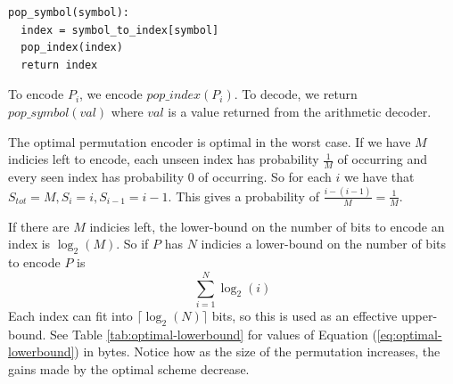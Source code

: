 \documentclass[a4paper]{report}
\begin{document}
\begin{verbatim}
pop_symbol(symbol):
  index = symbol_to_index[symbol]
  pop_index(index)
  return index
\end{verbatim}

To encode $P_i$, we encode $pop\_index(P_i)$. To decode, we return
$pop\_symbol(val)$ where $val$ is a value returned from the arithmetic
decoder.

The optimal permutation encoder is optimal in the worst case. If we have $M$
indicies left to encode, each unseen index has probability $\frac{1}{M}$ of
occurring and every seen index has probability $0$ of occurring. So for each
$i$ we have that $S_{tot}=M, S_i = i, S_{i-1} = i-1$. This gives a probability
of $\frac{i-(i-1)}{M} = \frac{1}{M}$.

If there are $M$ indicies left, the lower-bound on the number of bits to
encode an index is $\log_2(M)$. So if $P$ has $N$ indicies a lower-bound on
the number of bits to encode $P$ is
\begin{equation}
  \displaystyle\sum^{N}_{i=1} \log_2(i)
  \label{eq:optimal-lowerbound}
\end{equation}
Each index can fit into $\lceil\log_2(N)\rceil$ bits, so this is used as an
effective upper-bound. See Table \ref{tab:optimal-lowerbound} for values of
Equation (\ref{eq:optimal-lowerbound}) in bytes. Notice how as the size of the
permutation increases, the gains made by the optimal scheme decrease.


\begin{table}
  \center
  \caption{Number of bytes needed for storing permutations of different
    sizes. See Equation (\ref{eq:optimal-lowerbound}) for the lower bound. The
    effective upper-bound is
    $\lceil\log_2(N)\rceil/8$.} \label{tab:optimal-lowerbound}
\end{table}
\end{document}
